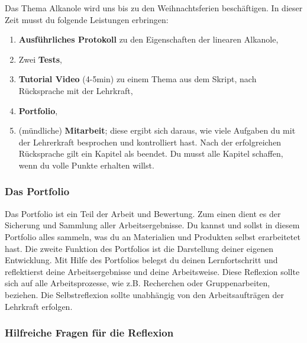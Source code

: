 \documentclass{scrartcl}  %
\begin{document}
					Das Thema Alkanole wird uns bis zu den Weihnachtsferien beschäftigen. In dieser Zeit musst du folgende Leistungen erbringen:
					\begin{enumerate}
						\item \textbf{Ausführliches Protokoll} zu den Eigenschaften der linearen Alkanole,
						\item Zwei \textbf{Tests},
						\item \textbf{Tutorial Video} (4-5min) zu einem Thema aus dem Skript, nach Rücksprache mit der Lehrkraft,
						\item \textbf{Portfolio},
						\item (mündliche) \textbf{Mitarbeit}; diese ergibt sich daraus, wie viele Aufgaben du mit der Lehrerkraft besprochen und kontrolliert hast. Nach der erfolgreichen Rücksprache gilt ein Kapitel als beendet. Du musst alle Kapitel schaffen, wenn du volle Punkte erhalten willst.  
					\end{enumerate}
	
					\subsubsection{Das Portfolio}
					
						Das Portfolio ist ein Teil der Arbeit und Bewertung. Zum einen dient es der Sicherung und Sammlung aller Arbeitsergebnisse. Du kannst und sollst in diesem Portfolio alles sammeln, was du an Materialien und Produkten selbst erarbeitetet hast. 
						Die zweite Funktion des Portfolios ist die Darstellung deiner eigenen Entwicklung. Mit Hilfe des Portfolios belegst du deinen Lernfortschritt und reflektierst deine Arbeitsergebnisse und deine Arbeitsweise. Diese Reflexion sollte sich  auf alle Arbeitsprozesse, wie z.B. Recherchen oder Gruppenarbeiten, beziehen. Die Selbstreflexion sollte unabhängig von den Arbeitsaufträgen der Lehrkraft erfolgen.
			
					\subsubsection{Hilfreiche Fragen für die Reflexion}
			
						\begin{center}
						\end{center}
						
\end{document}
